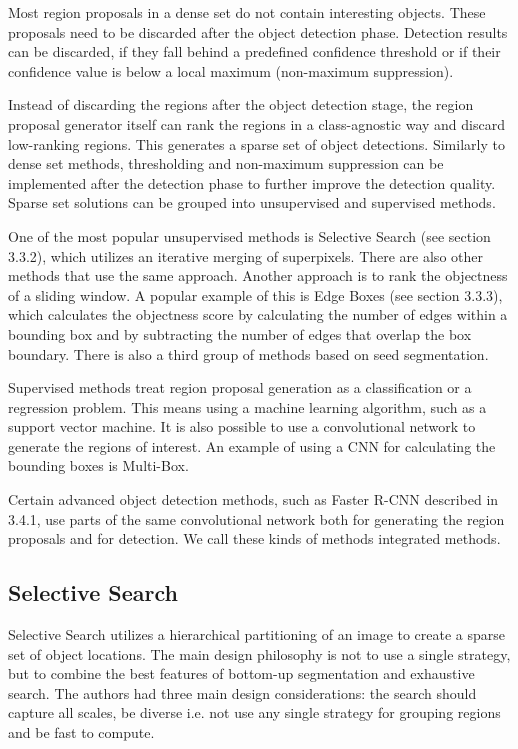 Most region proposals in a dense set do not contain interesting objects. These proposals need to be discarded after the object detection phase. Detection results can be discarded, if they fall behind a predefined confidence threshold or if their confidence value is below a local maximum (non-maximum suppression).

Instead of discarding the regions after the object detection stage, the region proposal generator itself can rank the regions in a class-agnostic way and discard low-ranking regions. This generates a sparse set of object detections. Similarly to dense set methods, thresholding and non-maximum suppression can be implemented after the detection phase to further improve the detection quality. Sparse set solutions can be grouped into unsupervised and supervised methods.

One of the most popular unsupervised methods is Selective Search (see section 3.3.2), which utilizes an iterative merging of superpixels. There are also other methods that use the same approach. Another approach is to rank the objectness of a sliding window. A popular example of this is Edge Boxes (see section 3.3.3), which calculates the objectness score by calculating the number of edges within a bounding box and by subtracting the number of edges that overlap the box boundary. There is also a third group of methods based on seed segmentation.

Supervised methods treat region proposal generation as a classification or a regression problem. This means using a machine learning algorithm, such as a support vector machine. It is also possible to use a convolutional network to generate the regions of interest. An example of using a CNN for calculating the bounding boxes is Multi-Box.

Certain advanced object detection methods, such as Faster R-CNN described in 3.4.1, use parts of the same convolutional network both for generating the region proposals and for detection. We call these kinds of methods integrated methods.

\subsection{Selective Search}
Selective Search utilizes a hierarchical partitioning of an image to create a sparse set of object locations. The main design philosophy is not to use a single strategy, but to combine the best features of bottom-up segmentation and exhaustive search. The authors had three main design considerations: the search should capture all scales, be diverse i.e. not use any single strategy for grouping regions and be fast to compute.

